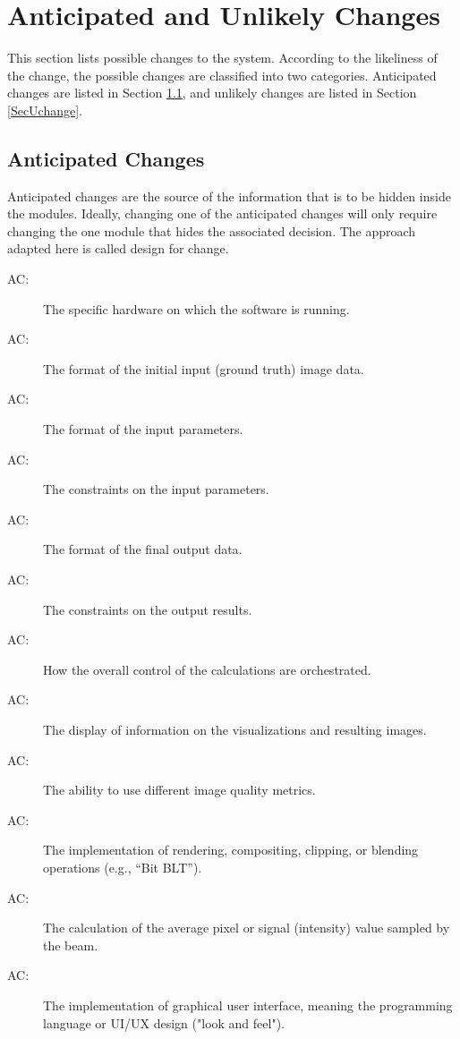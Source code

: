 \documentclass[12pt, titlepage]{article}
\newcounter{acnum}
\newcommand{\actheacnum}{AC\theacnum}
\begin{document}
\section{Anticipated and Unlikely Changes} \label{SecChange}

This section lists possible changes to the system. According to the likeliness
of the change, the possible changes are classified into two
categories. Anticipated changes are listed in Section \ref{SecAchange}, and
unlikely changes are listed in Section \ref{SecUchange}.

\subsection{Anticipated Changes} \label{SecAchange}

Anticipated changes are the source of the information that is to be hidden
inside the modules. Ideally, changing one of the anticipated changes will only
require changing the one module that hides the associated decision. The approach
adapted here is called design for
change.

\begin{description}
  \item[ \actheacnum \label{AC_hardware}:] The specific
    hardware on which the software is running.
  \item[ \actheacnum \label{AC_inImage}:] The format of the
    initial input (ground truth) image data.
  \item[ \actheacnum \label{AC_inParamsFormat}:] The format of the input parameters.
  \item[ \actheacnum \label{AC_inParamsVerif}:] The constraints on the input parameters.
  \item[ \actheacnum \label{AC_outFormat}:] The format of the final output data.
  \item[ \actheacnum \label{AC_outVerif}:] The constraints on the output results.
  \item[ \actheacnum \label{AC_calc}:] How the overall control of the
    calculations are orchestrated.
  \item[ \actheacnum \label{AC_dispInfo}:] The display of information on
    the visualizations and resulting images.
  \item[ \actheacnum \label{AC_imgMetricAlgos}:] The ability
    to use different image quality metrics.
  \item[ \actheacnum \label{AC_maskOpts}:] The implementation of rendering,
    compositing, clipping, or blending operations (e.g., ``Bit BLT'').
  \item[ \actheacnum \label{AC_calcSignal}:] The calculation of the
    average pixel or signal (intensity) value sampled by the beam.
  \item[ \actheacnum \label{AC_GUI}:] The implementation of graphical user
    interface, meaning the programming language or UI/UX design ("look and feel").
\end{description}
\end{document}
